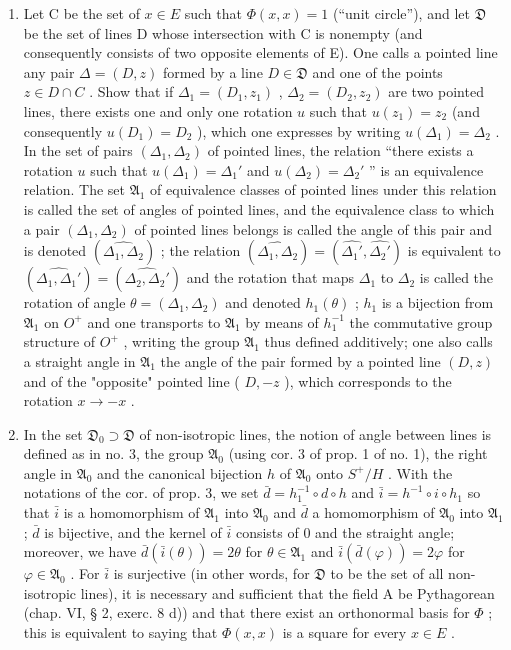 \begin{enumerate}
\def\labelenumi{\alph{enumi})}
\item
  Let C be the set of \(x \in E\) such that \(\Phi(x, x) = 1\) (“unit circle”), and let \(\mathfrak{D}\) be the set of lines D whose intersection with C is nonempty (and consequently consists of two opposite elements of E). One calls a pointed line any pair \(\Delta = (D, z)\) formed by a line \(D \in \mathfrak{D}\) and one of the points \(z \in D \cap C\) . Show that if \(\Delta_1 = (D_1, z_1)\) , \(\Delta_2 = (D_2, z_2)\) are two pointed lines, there exists one and only one rotation \(u\) such that \(u(z_1) = z_2\) (and consequently \(u(D_1) = D_2\) ), which one expresses by writing \(u(\Delta_1) = \Delta_2\) . In the set of pairs \((\Delta_1, \Delta_2)\) of pointed lines, the relation “there exists a rotation \(u\) such that \(u(\Delta_1) = \Delta_1'\) and \(u(\Delta_2) = \Delta_2'\) ” is an equivalence relation. The set \(\mathfrak{A}_1\) of equivalence classes of pointed lines under this relation is called the set of angles of pointed lines, and the equivalence class to which a pair \((\Delta_1, \Delta_2)\) of pointed lines belongs is called the angle of this pair and is denoted \((\widehat{\Delta_1, \Delta_2})\) ; the relation \((\widehat{\Delta_1, \Delta_2}) = (\widehat{\Delta_1'}, \widehat{\Delta_2'})\) is equivalent to \((\widehat{\Delta_1, \Delta_1'}) = (\widehat{\Delta_2, \Delta_2'})\) and the rotation that maps \(\Delta_1\) to \(\Delta_2\) is called the rotation of angle \(\theta = (\Delta_1, \Delta_2)\) and denoted \(h_1(\theta)\) ; \(h_1\) is a bijection from \(\mathfrak{A}_1\) on \(O^+\) and one transports to \(\mathfrak{A}_1\) by means of \(h_1^{-1}\) the commutative group structure of \(O^+\) , writing the group \(\mathfrak{A}_1\) thus defined additively; one also calls a straight angle in \(\mathfrak{A}_1\) the angle of the pair formed by a pointed line \((D, z)\) and of the "opposite" pointed line ( \(D, -z\) ), which corresponds to the rotation \(x \to -x\) .
\item
  In the set \(\mathfrak{D}_{0} \supset \mathfrak{D}\) of non-isotropic lines, the notion of angle between lines is defined as in no. 3, the group \(\mathfrak{A}_{0}\) (using cor. 3 of prop. 1 of no. 1), the right angle in \(\mathfrak{A}_{0}\) and the canonical bijection \(h\) of \(\mathfrak{A}_{0}\) onto \(S^{+}/H\) . With the notations of the cor. of prop. 3, we set \(\bar{d} = h_{1}^{-1} \circ d \circ h\) and \(\bar{i} = h^{-1} \circ i \circ h_{1}\) so that \(\bar{i}\) is a homomorphism of \(\mathfrak{A}_{1}\) into \(\mathfrak{A}_{0}\) and \(\bar{d}\) a homomorphism of \(\mathfrak{A}_{0}\) into \(\mathfrak{A}_{1}\) ; \(\bar{d}\) is bijective, and the kernel of \(\bar{i}\) consists of 0 and the straight angle; moreover, we have \(\bar{d}(\bar{i}(\theta)) = 2\theta\) for \(\theta \in \mathfrak{A}_{1}\) and \(\bar{i}(\bar{d}(\varphi)) = 2\varphi\) for \(\varphi \in \mathfrak{A}_{0}\) . For \(\bar{i}\) is surjective (in other words, for \(\mathfrak{D}\) to be the set of all non-isotropic lines), it is necessary and sufficient that the field A be Pythagorean (chap. VI, § 2, exerc. 8 d)) and that there exist an orthonormal basis for \(\Phi\) ; this is equivalent to saying that \(\Phi(x, x)\) is a square for every \(x \in E\) .

\end{enumerate}
